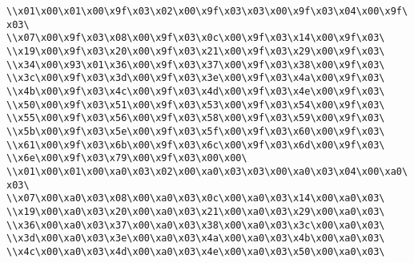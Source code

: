 \verb|\\x01\x00\x01\x00\x9f\x03\x02\x00\x9f\x03\x03\x00\x9f\x03\x04\x00\x9f\x03\|\newline
\verb|\\x07\x00\x9f\x03\x08\x00\x9f\x03\x0c\x00\x9f\x03\x14\x00\x9f\x03\|\newline
\verb|\\x19\x00\x9f\x03\x20\x00\x9f\x03\x21\x00\x9f\x03\x29\x00\x9f\x03\|\newline
\verb|\\x34\x00\x93\x01\x36\x00\x9f\x03\x37\x00\x9f\x03\x38\x00\x9f\x03\|\newline
\verb|\\x3c\x00\x9f\x03\x3d\x00\x9f\x03\x3e\x00\x9f\x03\x4a\x00\x9f\x03\|\newline
\verb|\\x4b\x00\x9f\x03\x4c\x00\x9f\x03\x4d\x00\x9f\x03\x4e\x00\x9f\x03\|\newline
\verb|\\x50\x00\x9f\x03\x51\x00\x9f\x03\x53\x00\x9f\x03\x54\x00\x9f\x03\|\newline
\verb|\\x55\x00\x9f\x03\x56\x00\x9f\x03\x58\x00\x9f\x03\x59\x00\x9f\x03\|\newline
\verb|\\x5b\x00\x9f\x03\x5e\x00\x9f\x03\x5f\x00\x9f\x03\x60\x00\x9f\x03\|\newline
\verb|\\x61\x00\x9f\x03\x6b\x00\x9f\x03\x6c\x00\x9f\x03\x6d\x00\x9f\x03\|\newline
\verb|\\x6e\x00\x9f\x03\x79\x00\x9f\x03\x00\x00\|\newline
\verb|\\x01\x00\x01\x00\xa0\x03\x02\x00\xa0\x03\x03\x00\xa0\x03\x04\x00\xa0\x03\|\newline
\verb|\\x07\x00\xa0\x03\x08\x00\xa0\x03\x0c\x00\xa0\x03\x14\x00\xa0\x03\|\newline
\verb|\\x19\x00\xa0\x03\x20\x00\xa0\x03\x21\x00\xa0\x03\x29\x00\xa0\x03\|\newline
\verb|\\x36\x00\xa0\x03\x37\x00\xa0\x03\x38\x00\xa0\x03\x3c\x00\xa0\x03\|\newline
\verb|\\x3d\x00\xa0\x03\x3e\x00\xa0\x03\x4a\x00\xa0\x03\x4b\x00\xa0\x03\|\newline
\verb|\\x4c\x00\xa0\x03\x4d\x00\xa0\x03\x4e\x00\xa0\x03\x50\x00\xa0\x03\|\newline

